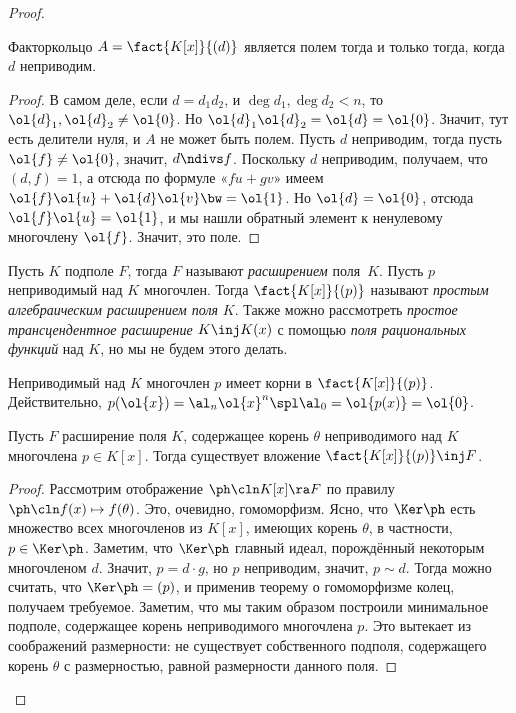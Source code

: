 \documentclass[a4paper]{article}
\newcommand{\kph}{\Ker \ph}
\begin{document}
\begin{proof}
\begin{theorem}
Факторкольцо $A=\fact{K[x]}{(d)}$ является полем тогда и только тогда, когда~$d$ неприводим.
\end{theorem}
\begin{proof}
В самом деле, если $d=d_1d_2$, и $\deg d_1, \deg d_2 < n$, то $\ol{d}_1, \ol{d}_2 \neq \ol{0}$. Но
$\ol{d}_1\ol{d}_2=\ol{d}=\ol{0}$. Значит, тут есть делители нуля, и $A$ не может быть полем. Пусть $d$
неприводим, тогда пусть $\ol{f} \neq \ol{0}$, значит, $d \ndivs f$.  Поскольку $d$ неприводим, получаем, что
$(d,f)=1$, а отсюда по формуле «$fu+gv$» имеем $\ol{f}\ol{u}+\ol{d}\ol{v} \bw=\ol{1}$. Но $\ol{d}=\ol{0}$, отсюда
$\ol{f}\ol{u}=\ol{1}$, и мы нашли обратный элемент к ненулевому многочлену $\ol{f}$. Значит, это поле.
\end{proof}

\begin{df}
Пусть $K$ подполе $F$, тогда $F$ называют \emph{расширением} поля~$K$.
Пусть $p$ неприводимый над $K$ многочлен. Тогда $\fact{K[x]}{(p)}$ называют \emph{простым
алгебраическим расширением поля} $K$. Также можно рассмотреть \emph{простое трансцендентное
расширение} $K \inj K(x)$ с помощью \emph{поля рациональных функций} над $K$, но мы не будем этого делать.
\end{df}

Неприводимый над $K$ многочлен $p$ имеет корни в $\fact{K[x]}{(p)}$. Действительно, $p(\ol{x})=
\al_n\ol{x}^n \spl \al_0=\ol{p(x)}=\ol{0}$.

\begin{theorem}[О вложении]
Пусть $F$ расширение поля $K$, содержащее корень $\theta$ неприводимого над  $K$ многочлена $p \in K[x]$.
Тогда существует вложение $\fact{K[x]}{(p)} \inj F$.
\end{theorem}
\begin{proof}
Рассмотрим отображение $\ph\cln K[x] \ra F$ по правилу $\ph\cln f(x) \mapsto f(\theta)$.  Это, очевидно,
гомоморфизм. Ясно, что $\kph$ есть множество всех многочленов из $K[x]$, имеющих корень $\theta$, в
частности, $p \in \kph$. Заметим, что $\kph$ главный идеал, порождённый некоторым многочленом $d$. Значит,
$p = d \cdot g$, но $p$ неприводим, значит, $p \sim d$. Тогда можно считать, что $\kph = (p)$, и применив
теорему о гомоморфизме колец, получаем требуемое. Заметим, что мы таким образом построили минимальное
подполе, содержащее корень неприводимого многочлена $p$. Это вытекает из соображений размерности: не
существует собственного подполя, содержащего корень $\theta$ с размерностью, равной размерности данного поля.
\end{proof}


\end{proof}
\end{document}
